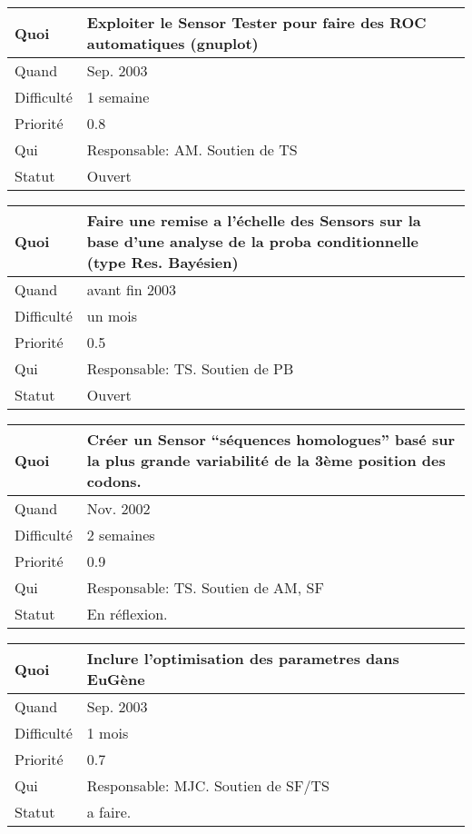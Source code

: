 \documentclass[a4paper,11pt]{article}
\begin{document}
\begin{longtable}{|l|p{7cm}|}\hline
  Quoi & Exploiter le Sensor Tester pour faire des ROC automatiques (gnuplot)\\\hline
  Quand  &  Sep. 2003\\\hline
  Difficult\'e &  1 semaine \\\hline
  Priorit\'e &  0.8\\\hline
  Qui & Responsable: AM. Soutien de TS\\\hline
  Statut & Ouvert\\\hline
\end{longtable}

\begin{longtable}{|l|p{7cm}|}\hline
  Quoi & Faire une remise a l'\'echelle des Sensors sur la base d'une analyse de la proba conditionnelle (type Res. Bay\'esien)\\\hline
  Quand  &  avant fin 2003\\\hline
  Difficult\'e &  un mois\\\hline
  Priorit\'e &  0.5 \\\hline
  Qui & Responsable: TS. Soutien de PB\\\hline
  Statut & Ouvert\\\hline
\end{longtable}

\begin{longtable}{|l|p{7cm}|}\hline
  Quoi & Cr\'eer un Sensor ``s\'equences homologues'' bas\'e sur la
  plus grande variabilit\'e de la 3\`eme position des codons.\\\hline
  Quand  & Nov. 2002 \\\hline
  Difficult\'e &  2 semaines\\\hline
  Priorit\'e &  0.9 \\\hline
  Qui & Responsable: TS. Soutien de AM, SF\\\hline
  Statut & En r\'eflexion.\\\hline
\end{longtable}

\begin{longtable}{|l|p{7cm}|}\hline
  Quoi & Inclure l'optimisation des parametres dans EuG\`ene\\\hline
  Quand  &  Sep. 2003\\\hline
  Difficult\'e & 1 mois \\\hline
  Priorit\'e & 0.7\\\hline
  Qui & Responsable: MJC. Soutien de SF/TS\\\hline
  Statut & a faire.\\\hline
\end{longtable}
\end{document}
